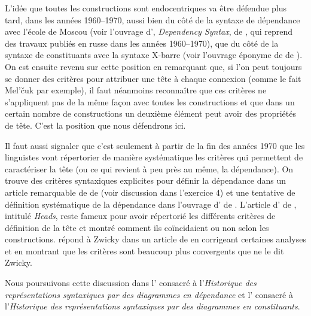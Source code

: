 {    L’idée que toutes les constructions sont endocentriques va être défendue plus tard, dans les années 1960--1970, aussi bien du côté de la syntaxe de dépendance avec l’école de Moscou (voir l’ouvrage d’, \textit{Dependency Syntax}, de \citeyear{melcuk1988dependency}, qui reprend des travaux publiés en russe dans les années 1960--1970), que du côté de la syntaxe de constituants avec la syntaxe X-barre (voir l’ouvrage éponyme de  de \citeyear{jackendoff1977x}). On est ensuite revenu sur cette position en remarquant que, si l’on peut toujours se donner des critères pour attribuer une tête à chaque connexion (comme le fait Mel’čuk par exemple), il faut néanmoins reconnaître que ces critères ne s’appliquent pas de la même façon avec toutes les constructions et que dans un certain nombre de constructions un deuxième élément peut avoir des propriétés de tête. C’est la position que nous défendrons ici.

    Il faut aussi signaler que c’est seulement à partir de la fin des années 1970 que les linguistes vont répertorier de manière systématique les critères qui permettent de caractériser la tête (ou ce qui revient à peu près au même, la dépendance). On trouve des critères syntaxiques explicites pour définir la dépendance dans un article remarquable de  de \citeyear{garde1977ordre} (voir discussion dans l’exercice 4) et une tentative de définition systématique de la dépendance dans l’ouvrage d’ de \citeyear{melcuk1988dependency}. L’article d’ de \citeyear{zwicky1985heads}, intitulé \textit{Heads}, reste fameux pour avoir répertorié les différents critères de définition de la tête et montré comment ils coïncidaient ou non selon les constructions.  répond à Zwicky dans un article de \citeyear{hudson1987zwicky} en corrigeant certaines analyses et en montrant que les critères sont beaucoup plus convergents que ne le dit Zwicky.

    Nous poursuivons cette discussion dans l’ consacré à l’\textit{Historique des représentations syntaxiques par des diagrammes en dépendance} et l’ consacré à l’\textit{Historique des représentations syntaxiques par des diagrammes en constituants}.
}

